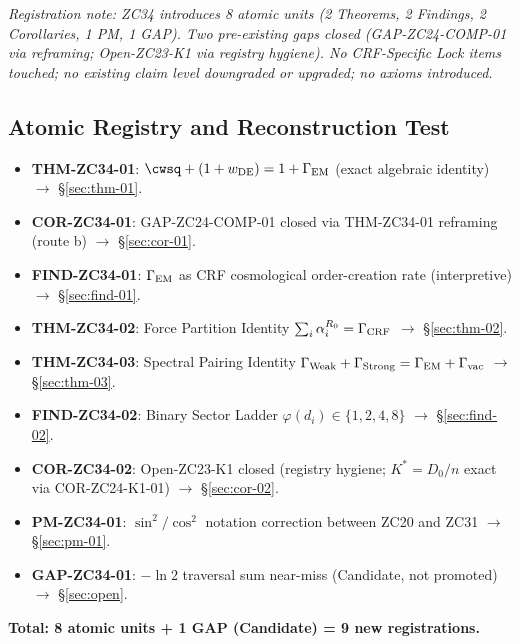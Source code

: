\documentclass[12pt, a4paper]{article}
\begin{document}
\textit{Registration note: ZC34 introduces 8 atomic units
(2 Theorems, 2 Findings, 2 Corollaries, 1 PM, 1 GAP).
Two pre-existing gaps closed (GAP-ZC24-COMP-01 via reframing;
Open-ZC23-K1 via registry hygiene). No CRF-Specific Lock
items touched; no existing claim level downgraded or upgraded;
no axioms introduced.}

\subsection{Atomic Registry and Reconstruction Test}
\label{sec:registry}

\begin{formalbox}[title={Atomic Units Introduced by TASK-ZC34
  (8 units)}]
\begin{itemize}[leftmargin=*, noitemsep]
  \item \textbf{THM-ZC34-01}: $\cwsq + (1+w_{\rm DE}) = 1 +
    \Gamma_{\rm EM}$ (exact algebraic identity)
    $\to$ \S\ref{sec:thm-01}.
  \item \textbf{COR-ZC34-01}: GAP-ZC24-COMP-01 closed via
    THM-ZC34-01 reframing (route b)
    $\to$ \S\ref{sec:cor-01}.
  \item \textbf{FIND-ZC34-01}: $\Gamma_{\rm EM}$ as CRF
    cosmological order-creation rate (interpretive)
    $\to$ \S\ref{sec:find-01}.
  \item \textbf{THM-ZC34-02}: Force Partition Identity
    $\sum_i \alpha_i^{R_0} = \Gamma_{\rm CRF}$
    $\to$ \S\ref{sec:thm-02}.
  \item \textbf{THM-ZC34-03}: Spectral Pairing Identity
    $\Gamma_{\rm Weak} + \Gamma_{\rm Strong} =
    \Gamma_{\rm EM} + \Gamma_{\rm vac}$
    $\to$ \S\ref{sec:thm-03}.
  \item \textbf{FIND-ZC34-02}: Binary Sector Ladder
    $\varphi(d_i) \in \{1, 2, 4, 8\}$
    $\to$ \S\ref{sec:find-02}.
  \item \textbf{COR-ZC34-02}: Open-ZC23-K1 closed (registry
    hygiene; $K^* = D_0/n$ exact via COR-ZC24-K1-01)
    $\to$ \S\ref{sec:cor-02}.
  \item \textbf{PM-ZC34-01}: $\sin^2/\cos^2$ notation
    correction between ZC20 and ZC31
    $\to$ \S\ref{sec:pm-01}.
  \item \textbf{GAP-ZC34-01}: $-\ln 2$ traversal sum
    near-miss (Candidate, not promoted)
    $\to$ \S\ref{sec:open}.
\end{itemize}
\textbf{Total: 8 atomic units + 1 GAP (Candidate)
= 9 new registrations.}
\end{formalbox}
\end{document}
